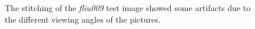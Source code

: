 \begin{figure}
	\centering
	\caption{The stitching of the \textit{fliu009} test image showed some artifacts due to the different viewing angles of the pictures.}
	\label{fig:9_artifacts}
\end{figure}